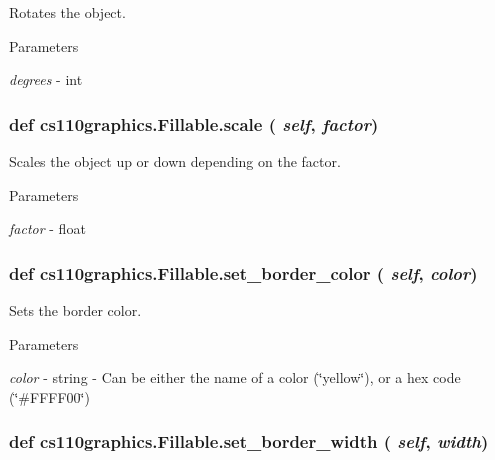 Rotates the object. 
\begin{DoxyParams}{Parameters}
\item[{\em degrees}]-\/ int \end{DoxyParams}
\hypertarget{classcs110graphics_1_1Fillable_a80d5b6b6d2ebae867dccecb803075749}{
\subsubsection[{scale}]{\setlength{\rightskip}{0pt plus 5cm}def cs110graphics.Fillable.scale ( {\em self}, \/   {\em factor})}}
\label{classcs110graphics_1_1Fillable_a80d5b6b6d2ebae867dccecb803075749}


Scales the object up or down depending on the factor. 
\begin{DoxyParams}{Parameters}
\item[{\em factor}]-\/ float \end{DoxyParams}
\hypertarget{classcs110graphics_1_1Fillable_a2f830be5d970faac97759910d20d68a4}{
\subsubsection[{set\_\-border\_\-color}]{\setlength{\rightskip}{0pt plus 5cm}def cs110graphics.Fillable.set\_\-border\_\-color ( {\em self}, \/   {\em color})}}
\label{classcs110graphics_1_1Fillable_a2f830be5d970faac97759910d20d68a4}


Sets the border color. 
\begin{DoxyParams}{Parameters}
\item[{\em color}]-\/ string -\/ Can be either the name of a color (\char`\"{}yellow\char`\"{}), or a hex code (\char`\"{}\#FFFF00\char`\"{}) \end{DoxyParams}
\hypertarget{classcs110graphics_1_1Fillable_a09f05462cb2ed38fdccb244340f05b2b}{
\subsubsection[{set\_\-border\_\-width}]{\setlength{\rightskip}{0pt plus 5cm}def cs110graphics.Fillable.set\_\-border\_\-width ( {\em self}, \/   {\em width})}}
\label{classcs110graphics_1_1Fillable_a09f05462cb2ed38fdccb244340f05b2b}


